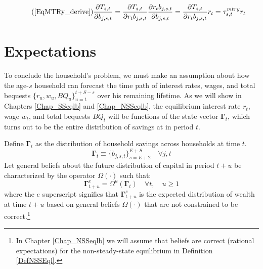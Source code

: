   \begin{equation}\tag{\ref{EqMTRy_derive}}
    \frac{\partial T_{s,t}}{\partial b_{j,s,t}} = \frac{\partial T_{s,t}}{\partial r_{t}b_{j,s,t}}\frac{\partial r_t b_{j,s,t}}{\partial b_{j,s,t}} = \frac{\partial T_{s,t}}{\partial r_t b_{j,s,t}}r_{t} = \tau^{mtry}_{s,t}r_t
  \end{equation}


\section{Expectations}\label{SecHHexp}

  To conclude the household's problem, we must make an assumption about how the age-$s$ household can forecast the time path of interest rates, wages, and total bequests $\{r_u, w_u, BQ_u\}_{u=t}^{t+S-s}$ over his remaining lifetime. As we will show in Chapters \ref{Chap_SSeqlb} and \ref{Chap_NSSeqlb}, the equilibrium interest rate $r_t$, wage $w_t$, and total bequests $BQ_t$ will be functions of the state vector $\bm{\Gamma}_t$, which turns out to be the entire distribution of savings at in period $t$.

  Define $\bm{\Gamma}_t$ as the distribution of household savings across households at time $t$.
  \begin{equation}\label{EqSavDist}
    \bm{\Gamma}_t \equiv \bigl\{b_{j,s,t}\bigr\}_{s=E+2}^{E+S} \quad\forall j,t
  \end{equation}
  Let general beliefs about the future distribution of capital in period $t+u$ be characterized by the operator $\Omega(\cdot)$ such that:
  \begin{equation}\label{EqBeliefs}
    \bm{\Gamma}^e_{t+u} = \Omega^u\left(\bm{\Gamma}_t\right) \quad \forall t, \quad u\geq 1
  \end{equation}
  where the $e$ superscript signifies that $\bm{\Gamma}^e_{t+u}$ is the expected distribution of wealth at time $t+u$ based on general beliefs $\Omega(\cdot)$ that are not constrained to be correct.\footnote{In Chapter \ref{Chap_NSSeqlb} we will assume that beliefs are correct (rational expectations) for the non-steady-state equilibrium in Definition \ref{DefNSSEql}.}
